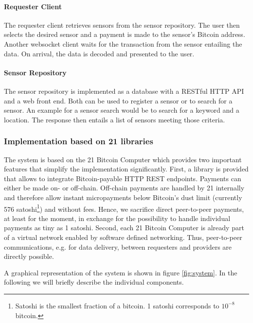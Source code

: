 \paragraph{Requester Client}
The requester client retrieves sensors from the sensor repository. The user then selects the desired sensor and a payment is made to the sensor's Bitcoin address. Another websocket client waits for the transaction from the sensor entailing the data. On arrival, the data is decoded and presented to the user.

\paragraph{Sensor Repository}
The sensor repository is implemented as a database with a RESTful HTTP API and
a web front end. Both can be used to register a sensor or to search for a sensor.
An example for a sensor search would be to search for a keyword and a location.
The response then entails a list of sensors meeting those criteria.

\subsubsection{Implementation based on 21 libraries}

The system is based on the 21 Bitcoin Computer which provides two important features that simplify the implementation significantly. First, a library is provided that allows to integrate Bitcoin-payable HTTP REST endpoints. Payments can either be made on- or off-chain. Off-chain payments are handled by 21 internally and therefore allow instant micropayments below Bitcoin's dust limit (currently 576 satoshi\footnote{Satoshi is the smallest fraction of a bitcoin. 1 satoshi corresponds to $10^{-8}$ bitcoin.}) and without fees. Hence, we sacrifice direct peer-to-peer payments, at least for the moment, in exchange for the possibility to handle individual payments as tiny as 1 satoshi. Second, each 21 Bitcoin Computer is already part of a virtual network enabled by software defined networking. Thus, peer-to-peer communications, e.g. for data delivery, between requesters and providers are directly possible. 

A graphical representation of the system is shown in figure \ref{fig:system}. In the following we will briefly describe the individual components.
